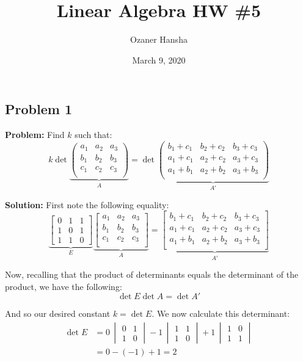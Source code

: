 \documentclass{article}
\begin{document}
\title{Linear Algebra HW \#5}
\author{Ozaner Hansha}
\date{March 9, 2020}
\maketitle

\subsection*{Problem 1}
\noindent\textbf{Problem:} Find $k$ such that:
$$k\det\underbrace{\begin{pmatrix}
  a_1&a_2&a_3\\
  b_1&b_2&b_3\\
  c_1&c_2&c_3\\
\end{pmatrix}}_{A}=\det\underbrace{\begin{pmatrix}
  b_1+c_1&b_2+c_2&b_3+c_3\\
  a_1+c_1&a_2+c_2&a_3+c_3\\
  a_1+b_1&a_2+b_2&a_3+b_3\\
\end{pmatrix}}_{A'}$$
\bigskip

\noindent\textbf{Solution:} First note the following equality:
$$\underbrace{\begin{bmatrix}
  0&1&1\\1&0&1\\1&1&0
\end{bmatrix}}_{E}\underbrace{\begin{bmatrix}
  a_1&a_2&a_3\\
  b_1&b_2&b_3\\
  c_1&c_2&c_3\\
\end{bmatrix}}_{A}=\underbrace{\begin{bmatrix}
  b_1+c_1&b_2+c_2&b_3+c_3\\
  a_1+c_1&a_2+c_2&a_3+c_3\\
  a_1+b_1&a_2+b_2&a_3+b_3\\
\end{bmatrix}}_{A'}$$

Now, recalling that the product of determinants equals the determinant of the product, we have the following:
$$\det E\det A=\det A'$$

And so our desired constant $k=\det E$. We now calculate this determinant:
\begin{align*}
  \det E&=0\,{\begin{vmatrix}0&1\\1&0\end{vmatrix}}-1\,{\begin{vmatrix}1&1\\1&0\end{vmatrix}}+1\,{\begin{vmatrix}1&0\\1&1\end{vmatrix}}\\
  &=0-(-1)+1=2
\end{align*}
\end{document}

